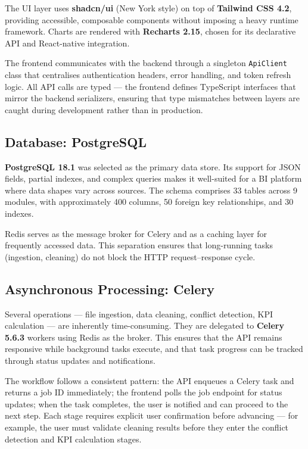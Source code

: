 \vspace{0.4cm}
\noindent
The UI layer uses \textbf{shadcn/ui} (New York style)
on top of \textbf{Tailwind CSS 4.2},
providing accessible, composable components
without imposing a heavy runtime framework.
Charts are rendered with \textbf{Recharts 2.15},
chosen for its declarative API and React-native integration.

\vspace{0.4cm}
\noindent
The frontend communicates with the backend
through a singleton \texttt{ApiClient} class
that centralises authentication headers,
error handling, and token refresh logic.
All API calls are typed — the frontend defines
TypeScript interfaces that mirror the backend serializers,
ensuring that type mismatches between layers
are caught during development rather than in production.

\subsection{Database: PostgreSQL}

\noindent
\textbf{PostgreSQL 18.1} was selected as the primary data store.
Its support for JSON fields, partial indexes, and
complex queries makes it well-suited for a BI platform
where data shapes vary across sources.
The schema comprises 33 tables across 9 modules,
with approximately 400 columns, 50 foreign key relationships,
and 30 indexes.

\vspace{0.4cm}
\noindent
Redis serves as the message broker for Celery
and as a caching layer for frequently accessed data.
This separation ensures that long-running tasks
(ingestion, cleaning)
do not block the HTTP request–response cycle.

\subsection{Asynchronous Processing: Celery}

\noindent
Several operations — file ingestion, data cleaning,
conflict detection, KPI calculation —
are inherently time-consuming.
They are delegated to \textbf{Celery 5.6.3} workers
using Redis as the broker.
This ensures that the API remains responsive
while background tasks execute,
and that task progress can be tracked
through status updates and notifications.

\vspace{0.4cm}
\noindent
The workflow follows a consistent pattern:
the API enqueues a Celery task and returns a job ID
immediately; the frontend polls the job endpoint
for status updates; when the task completes,
the user is notified and can proceed to the next step.
Each stage requires explicit user confirmation
before advancing — for example, the user must
validate cleaning results before they enter
the conflict detection and KPI calculation stages.


